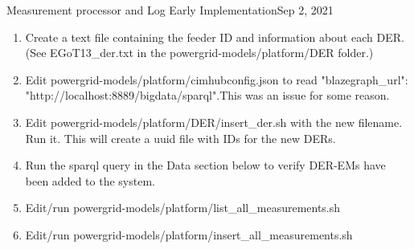\begin{entry}{Measurement processor and Log Early Implementation}{Sep 2, 2021}
    \begin{enumerate}
        \item Create a text file containing the feeder ID and information about each DER. (See EGoT13\_der.txt in the
        powergrid-models/platform/DER folder.)
        \item Edit powergrid-models/platform/cimhubconfig.json to read "blazegraph\_url":
        "http://localhost:8889/bigdata/sparql".This was an issue for some reason.
        \item Edit powergrid-models/platform/DER/insert\_der.sh with the new filename. Run it. This will create a uuid
        file with IDs for the new DERs.
        \item Run the sparql query in the Data section below to verify DER-EMs have been added to the system.
        \item Edit/run powergrid-models/platform/list\_all\_measurements.sh
        \item Edit/run powergrid-models/platform/insert\_all\_measurements.sh
    \end{enumerate}


    \data
    

\end{entry}
